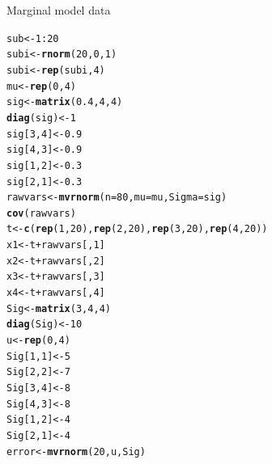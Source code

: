 \documentclass[11pt,a4paper,twoside]{book}\usepackage[]{graphicx}\usepackage[]{color}
\makeatletter
\newcommand{\hlnum}[1]{\textcolor[rgb]{0.686,0.059,0.569}{#1}}%
\newcommand{\hlopt}[1]{\textcolor[rgb]{0,0,0}{#1}}%
\newcommand{\hlstd}[1]{\textcolor[rgb]{0.345,0.345,0.345}{#1}}%
\newcommand{\hlkwb}[1]{\textcolor[rgb]{0.69,0.353,0.396}{#1}}%
\newcommand{\hlkwc}[1]{\textcolor[rgb]{0.333,0.667,0.333}{#1}}%
\newcommand{\hlkwd}[1]{\textcolor[rgb]{0.737,0.353,0.396}{\textbf{#1}}}%
\newenvironment{kframe}{%
 \def\at@end@of@kframe{}%
 \ifinner\ifhmode%
  \def\at@end@of@kframe{\end{minipage}}%
  \begin{minipage}{\columnwidth}%
 \fi\fi%
 \def\FrameCommand##1{\hskip\@totalleftmargin \hskip-\fboxsep
 \colorbox{shadecolor}{##1}\hskip-\fboxsep
     \hskip-\linewidth \hskip-\@totalleftmargin \hskip\columnwidth}%
 \MakeFramed {\advance\hsize-\width
   \@totalleftmargin\z@ \linewidth\hsize
   \@setminipage}}%
 {\par\unskip\endMakeFramed%
 \at@end@of@kframe}
\newenvironment{knitrout}{}{} %
\makeatother
\begin{document}
			\begin{codeenv}
		
\caption{Marginal model data}\label{r04:rmarg.data}
\begin{knitrout}
\color{fgcolor}\begin{kframe}
\begin{alltt}
\hlstd{sub} \hlkwb{<-} \hlnum{1}\hlopt{:}\hlnum{20}
\hlstd{subi} \hlkwb{<-} \hlkwd{rnorm}\hlstd{(}\hlnum{20}\hlstd{,} \hlnum{0}\hlstd{,} \hlnum{1}\hlstd{)}
\hlstd{subi} \hlkwb{<-} \hlkwd{rep}\hlstd{(subi,} \hlnum{4}\hlstd{)}
\hlstd{mu} \hlkwb{<-} \hlkwd{rep}\hlstd{(}\hlnum{0}\hlstd{,} \hlnum{4}\hlstd{)}
\hlstd{sig} \hlkwb{<-} \hlkwd{matrix}\hlstd{(}\hlnum{0.4}\hlstd{,} \hlnum{4}\hlstd{,} \hlnum{4}\hlstd{)}
\hlkwd{diag}\hlstd{(sig)} \hlkwb{<-} \hlnum{1}
\hlstd{sig[}\hlnum{3}\hlstd{,} \hlnum{4}\hlstd{]} \hlkwb{<-} \hlnum{0.9}
\hlstd{sig[}\hlnum{4}\hlstd{,} \hlnum{3}\hlstd{]} \hlkwb{<-} \hlnum{0.9}
\hlstd{sig[}\hlnum{1}\hlstd{,} \hlnum{2}\hlstd{]} \hlkwb{<-} \hlnum{0.3}
\hlstd{sig[}\hlnum{2}\hlstd{,} \hlnum{1}\hlstd{]} \hlkwb{<-} \hlnum{0.3}
\hlstd{rawvars} \hlkwb{<-} \hlkwd{mvrnorm}\hlstd{(}\hlkwc{n} \hlstd{=} \hlnum{80}\hlstd{,} \hlkwc{mu} \hlstd{= mu,} \hlkwc{Sigma} \hlstd{= sig)}
\hlkwd{cov}\hlstd{(rawvars)}
\hlstd{t} \hlkwb{<-} \hlkwd{c}\hlstd{(}\hlkwd{rep}\hlstd{(}\hlnum{1}\hlstd{,} \hlnum{20}\hlstd{),} \hlkwd{rep}\hlstd{(}\hlnum{2}\hlstd{,} \hlnum{20}\hlstd{),} \hlkwd{rep}\hlstd{(}\hlnum{3}\hlstd{,} \hlnum{20}\hlstd{),} \hlkwd{rep}\hlstd{(}\hlnum{4}\hlstd{,} \hlnum{20}\hlstd{))}
\hlstd{x1} \hlkwb{<-} \hlstd{t} \hlopt{+} \hlstd{rawvars[,} \hlnum{1}\hlstd{]}
\hlstd{x2} \hlkwb{<-} \hlstd{t} \hlopt{+} \hlstd{rawvars[,} \hlnum{2}\hlstd{]}
\hlstd{x3} \hlkwb{<-} \hlstd{t} \hlopt{+} \hlstd{rawvars[,} \hlnum{3}\hlstd{]}
\hlstd{x4} \hlkwb{<-} \hlstd{t} \hlopt{+} \hlstd{rawvars[,} \hlnum{4}\hlstd{]}
\hlstd{Sig} \hlkwb{<-} \hlkwd{matrix}\hlstd{(}\hlnum{3}\hlstd{,} \hlnum{4}\hlstd{,} \hlnum{4}\hlstd{)}
\hlkwd{diag}\hlstd{(Sig)} \hlkwb{<-} \hlnum{10}
\hlstd{u} \hlkwb{<-} \hlkwd{rep}\hlstd{(}\hlnum{0}\hlstd{,} \hlnum{4}\hlstd{)}
\hlstd{Sig[}\hlnum{1}\hlstd{,} \hlnum{1}\hlstd{]} \hlkwb{<-} \hlnum{5}
\hlstd{Sig[}\hlnum{2}\hlstd{,} \hlnum{2}\hlstd{]} \hlkwb{<-} \hlnum{7}
\hlstd{Sig[}\hlnum{3}\hlstd{,} \hlnum{4}\hlstd{]} \hlkwb{<-} \hlnum{8}
\hlstd{Sig[}\hlnum{4}\hlstd{,} \hlnum{3}\hlstd{]} \hlkwb{<-} \hlnum{8}
\hlstd{Sig[}\hlnum{1}\hlstd{,} \hlnum{2}\hlstd{]} \hlkwb{<-} \hlnum{4}
\hlstd{Sig[}\hlnum{2}\hlstd{,} \hlnum{1}\hlstd{]} \hlkwb{<-} \hlnum{4}
\hlstd{error} \hlkwb{<-} \hlkwd{mvrnorm}\hlstd{(}\hlnum{20}\hlstd{, u, Sig)}

\end{alltt}
\end{kframe}
\end{knitrout}
\end{codeenv}
\end{document}
